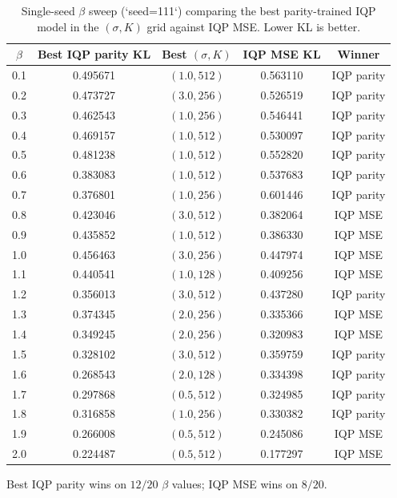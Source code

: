 \begin{table}[t]
\centering
\caption{Single-seed $\beta$ sweep (`seed=111`) comparing the best parity-trained IQP model in the $(\sigma,K)$ grid against IQP MSE. Lower KL is better.}
\label{tab:experiment9-single-seed-best-grid}
\setlength{\tabcolsep}{4pt}
\footnotesize
\begin{tabular}{ccccc}
\toprule
$\beta$ & Best IQP parity KL & Best $(\sigma, K)$ & IQP MSE KL & Winner \\
\midrule
0.1 & 0.495671 & $(1.0,512)$ & 0.563110 & IQP parity \\
0.2 & 0.473727 & $(3.0,256)$ & 0.526519 & IQP parity \\
0.3 & 0.462543 & $(1.0,256)$ & 0.546441 & IQP parity \\
0.4 & 0.469157 & $(1.0,512)$ & 0.530097 & IQP parity \\
0.5 & 0.481238 & $(1.0,512)$ & 0.552820 & IQP parity \\
0.6 & 0.383083 & $(1.0,512)$ & 0.537683 & IQP parity \\
0.7 & 0.376801 & $(1.0,256)$ & 0.601446 & IQP parity \\
0.8 & 0.423046 & $(3.0,512)$ & 0.382064 & IQP MSE \\
0.9 & 0.435852 & $(1.0,512)$ & 0.386330 & IQP MSE \\
1.0 & 0.456463 & $(3.0,256)$ & 0.447974 & IQP MSE \\
1.1 & 0.440541 & $(1.0,128)$ & 0.409256 & IQP MSE \\
1.2 & 0.356013 & $(3.0,512)$ & 0.437280 & IQP parity \\
1.3 & 0.374345 & $(2.0,256)$ & 0.335366 & IQP MSE \\
1.4 & 0.349245 & $(2.0,256)$ & 0.320983 & IQP MSE \\
1.5 & 0.328102 & $(3.0,512)$ & 0.359759 & IQP parity \\
1.6 & 0.268543 & $(2.0,128)$ & 0.334398 & IQP parity \\
1.7 & 0.297868 & $(0.5,512)$ & 0.324985 & IQP parity \\
1.8 & 0.316858 & $(1.0,256)$ & 0.330382 & IQP parity \\
1.9 & 0.266008 & $(0.5,512)$ & 0.245086 & IQP MSE \\
2.0 & 0.224487 & $(0.5,512)$ & 0.177297 & IQP MSE \\
\bottomrule
\end{tabular}
\vspace{2mm}

\footnotesize Best IQP parity wins on $12/20$ $\beta$ values; IQP MSE wins on $8/20$.
\end{table}

